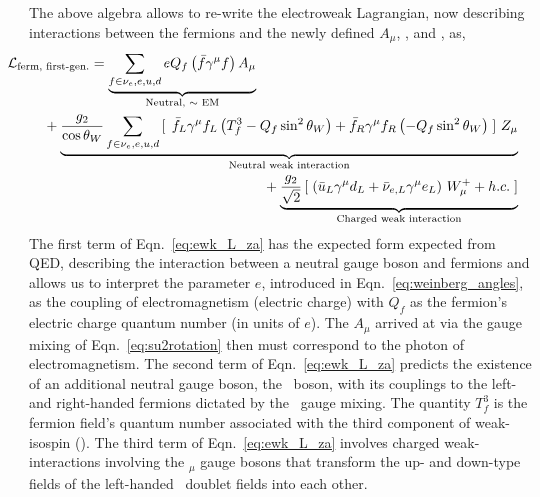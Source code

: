 The above algebra allows to re-write the electroweak Lagrangian, now
describing interactions between the fermions and the newly defined $A_{\mu}$, \fieldZ,
and \fieldWpm, as,
\begin{equation}
\begin{multlined}
\hspace{-0.9cm}\mathcal{L}_{\text{ferm, first-gen.}} = \underbrace{\sum\limits_{f \in \nu_e, e, u, d} e Q_f
\left(\bar{f}\gamma^{\mu} f \right) A_{\mu}}_\text{Neutral, $\sim$ EM}  \\
+ \underbrace{\frac{g_2}{\cos \theta_W} \sum\limits_{f \in \nu_e, e, u, d} \left[ \,\right.\bar{f}_L \gamma^{\mu} f_L
\left( T_f^3 -  Q_f \sin^2 \theta_W \right)
+ \bar{f}_R \gamma^{\mu} f_R \left(-Q_f \sin^2 \theta_W \right) \left. \right]\, Z_{\mu}}_\text{Neutral weak interaction} \\
+ \underbrace{\frac{g_2}{\sqrt{2}} \left[ \right. \left( \bar{u}_L \gamma^{\mu} d_L + \bar{\nu}_{e,L} \gamma^{\mu} e_L \right) \, W_{\mu}^+ + h.c. \left. \right]}_\text{Charged weak interaction}
\end{multlined}
\label{eq:ewk_L_za}
\end{equation}
The first term of Eqn.~\ref{eq:ewk_L_za} has the expected form expected from QED, describing the
interaction between a neutral gauge boson and fermions and allows us to interpret
the parameter $e$, introduced in Eqn.~\ref{eq:weinberg_angles}, as the coupling
of electromagnetism (electric charge) with $Q_f$ as the fermion's electric charge quantum number
(in units of $e$). The $A_{\mu}$ arrived at via the gauge mixing of Eqn.~\ref{eq:su2rotation}
then must correspond to the photon of electromagnetism.
The second term of Eqn.~\ref{eq:ewk_L_za} predicts the existence of an additional
neutral gauge boson, the \fieldZ~boson, with its couplings to the left- and right-handed
fermions dictated by the \SUewk~gauge mixing. The quantity $T_f^3$ is the fermion field's quantum
number associated with the third component of weak-isospin (\SUtwo).
The third term of Eqn.~\ref{eq:ewk_L_za} involves charged weak-interactions
involving the \fieldWpm$_{\mu}$ gauge bosons that transform the up- and down-type fields of
the left-handed \SUtwo~doublet fields into each other. 


